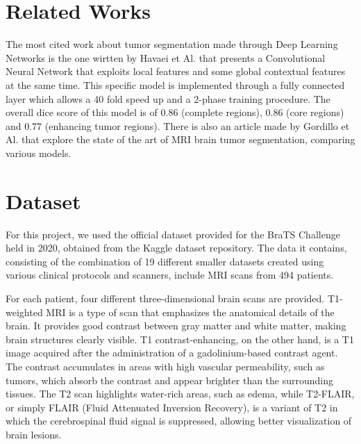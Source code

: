 \documentclass[10pt,twocolumn,letterpaper]{article}
\begin{document}
\section{Related Works}

The most cited work about tumor segmentation made through Deep Learning Networks is the one wirtten by Havaei et Al.\cite{HAVAEI201718} that presents a Convolutional Neural Network that exploits local features and some global contextual features at the same time. This specific model is implemented through a fully connected layer which allows a 40 fold speed up and a 2-phase training procedure. The overall dice score of this model is of 0.86 (complete regions), 0.86 (core regions) and 0.77 (enhancing tumor regions).
There is also an article made by Gordillo et Al.\cite{GORDILLO20131426} that explore the state of the art of MRI brain tumor segmentation, comparing various models.


\section{Dataset}

For this project, we used the official dataset\cite{BraTSdataset} provided for the BraTS Challenge held in 2020, obtained from the Kaggle dataset repository. The data it contains, consisting of the combination of 19 different smaller datasets created using various clinical protocols and scanners, include MRI scans from 494 patients.

For each patient, four different three-dimensional brain scans are provided. T1-weighted MRI is a type of scan that emphasizes the anatomical details of the brain. It provides good contrast between gray matter and white matter, making brain structures clearly visible. T1 contrast-enhancing, on the other hand, is a T1 image acquired after the administration of a gadolinium-based contrast agent. The contrast accumulates in areas with high vascular permeability, such as tumors, which absorb the contrast and appear brighter than the surrounding tissues. The T2 scan highlights water-rich areas, such as edema, while T2-FLAIR, or simply FLAIR (Fluid Attenuated Inversion Recovery), is a variant of T2 in which the cerebrospinal fluid signal is suppressed, allowing better visualization of brain lesions.
\end{document}
